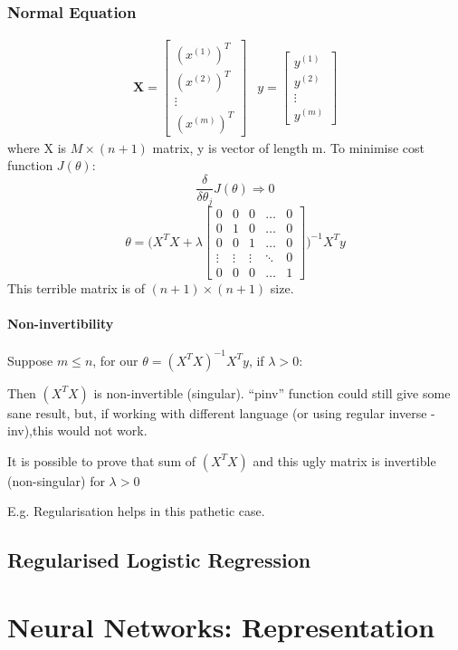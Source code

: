 \documentclass{scrartcl}
\begin{document}
\subsubsection{Normal Equation}
\label{sec:7-2-2}
\begin{equation*}
  \begin{array}{ll}
    \mathbf{X} = \left[ \begin{array}{c} (x^{(1)})^T \\ (x^{(2)})^T \\
        \vdots \\ (x^{(m)})^T \end{array} \right] & y =
    \left[ \begin{array}{c} y^{(1)}  \\ y^{(2)}  \\  \vdots \\ y^{(m)} \end{array} \right]
  \end{array}
\end{equation*}
where X is $M \times (n+1)$ matrix, y is vector of length m. To
minimise cost function $J(\theta)$: \[
\frac{\delta}{\delta \theta_j}J(\theta) \Rightarrow 0 \]
\[
\theta = \Big(X^T X + \lambda \left[ \begin{array}{ccccc} 0 & 0 & 0 &
    \dots & 0 \\ 0 & 1 & 0 & \dots & 0 \\ 0 & 0 & 1 & \dots & 0 \\
    \vdots & \vdots & \vdots & \ddots & 0 \\ 0 & 0 & 0 & \dots &
    1 \end{array} \right] \Big)^{-1} X^Ty
\]
This terrible matrix is of $(n+1) \times (n+1)$ size.

\paragraph{Non-invertibility}
Suppose $m \leq n$, for our $\theta = (X^T X)^{-1}X^Ty$, if $\lambda >
0$:

Then $(X^T X)$ is non-invertible (singular). ``pinv'' function could
still give some sane result, but, if working with different language
(or using regular inverse - inv),this would not work.

It is possible to prove that sum of $(X^T X)$ and this ugly matrix is
invertible (non-singular) for $\lambda > 0$

E.g. Regularisation helps in this pathetic case.

\subsection{Regularised Logistic Regression}
\label{sec:7-4}


\section{Neural Networks: Representation}
\label{sec:8}
\end{document}
